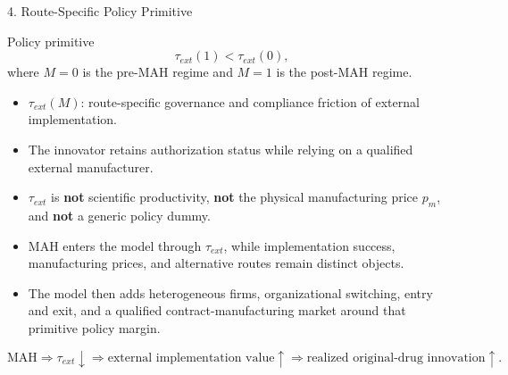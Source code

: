 \documentclass[aspectratio=169,11pt]{beamer}
\begin{document}
\begin{frame}{4. Route-Specific Policy Primitive}
\small
\begin{block}{Policy primitive}
\[
\tau_{ext}(1)<\tau_{ext}(0),
\]
where \(M=0\) is the pre-MAH regime and \(M=1\) is the post-MAH regime.
\end{block}

\begin{itemize}
\item \(\tau_{ext}(M)\): route-specific governance and compliance friction of external implementation.
\item The innovator retains authorization status while relying on a qualified external manufacturer.
\item \(\tau_{ext}\) is \textbf{not} scientific productivity, \textbf{not} the physical manufacturing price \(p_m\), and \textbf{not} a generic policy dummy.
\item MAH enters the model through \(\tau_{ext}\), while implementation success, manufacturing prices, and alternative routes remain distinct objects.
\item The model then adds heterogeneous firms, organizational switching, entry and exit, and a qualified contract-manufacturing market around that primitive policy margin.
\end{itemize}

\vspace{0.1cm}
\[
\text{MAH}\Rightarrow \tau_{ext}\downarrow \Rightarrow
\text{external implementation value}\uparrow \Rightarrow
\text{realized original-drug innovation}\uparrow.
\]
\end{frame}
\end{document}
